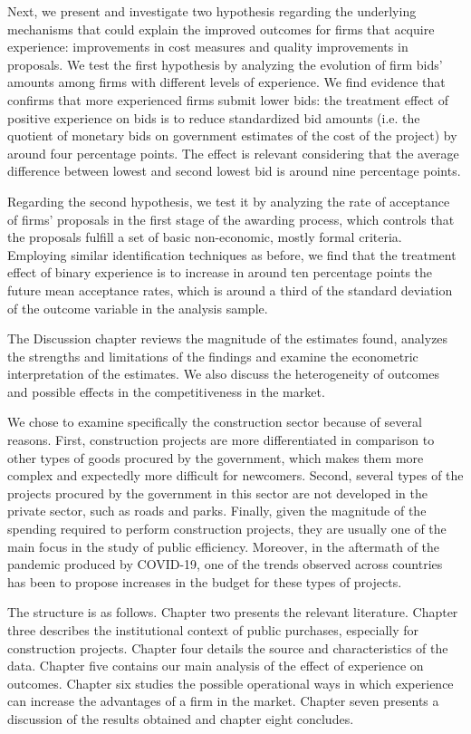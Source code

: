  Next, we present and investigate two hypothesis regarding the underlying mechanisms that could explain the improved outcomes for firms that acquire experience: improvements in cost measures and quality improvements in proposals. We test the first hypothesis by analyzing the evolution of firm bids' amounts among firms with different levels of experience. We find evidence that confirms that more experienced firms submit lower bids: the treatment effect of positive experience on bids is to reduce standardized bid amounts (i.e. the quotient of monetary bids on government estimates of the cost of the project) by around four percentage points. The effect is relevant considering that the average difference between lowest and second lowest bid is around nine percentage points.

Regarding the second hypothesis, we test it by analyzing the rate of acceptance of firms' proposals in the first stage of the awarding process, which controls that the proposals fulfill a set of basic non-economic, mostly formal criteria.  Employing similar identification techniques as before, we find that the treatment effect of binary experience is to increase in around ten percentage points the future mean acceptance rates, which is around a third of the standard deviation of the outcome variable in the analysis sample.

The Discussion chapter reviews the magnitude of the estimates found, analyzes the strengths and limitations of the findings and examine the econometric interpretation of the estimates. We also discuss the heterogeneity of outcomes and possible effects in the competitiveness in the market.

We chose to examine specifically the construction sector because of several reasons. First, construction projects are more differentiated in comparison to other types of goods procured by the government, which makes them more complex and expectedly more difficult for newcomers. Second, several types of the projects procured by the government in this sector are not developed in the private sector, such as roads and parks. Finally, given the magnitude of the spending required to perform construction projects, they are usually one of the main focus in the study of public efficiency. Moreover, in the aftermath of the pandemic produced by COVID-19, one of the trends observed across countries has been to propose increases in the budget for these types of projects.

The structure is as follows. Chapter two presents the relevant literature. Chapter three describes the institutional context of public purchases, especially for construction projects. Chapter four  details the source and characteristics of the data. Chapter five contains our main analysis of the effect of experience on outcomes. Chapter six studies the possible operational ways in which experience can increase the advantages of a firm in the market. Chapter seven presents a discussion of the results obtained and chapter eight concludes.
